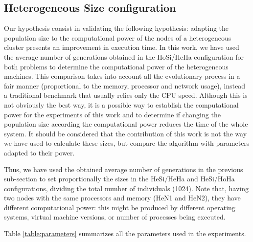 \documentclass[final,1p,times]{elsarticle}
\begin{document}
\subsection{Heterogeneous Size configuration}

Our hypothesis consist in validating the following hypothesis: adapting the population size to the computational power of the nodes of a heterogeneous cluster presents an improvement in execution time. In this work, we have used the average number of generations obtained in the HoSi/HeHa configuration for both problems to determine the computational power of the heterogeneous machines. This comparison takes into account all the evolutionary process in a fair manner (proportional to the memory, processor and network usage), instead a traditional benchmark that usually relies only the CPU speed. Although this is not obviously the best way, it is a possible way to establish the computational power for the experiments of this work and to determine if changing the population size according the computational power reduces the time of the whole system. It should be considered that the contribution of this work is not the way we have used to calculate these sizes, but compare the algorithm with parameters adapted to their power.

Thus, we have used the obtained average number of generations in the previous sub-section to set proportionally the sizes in the HeSi/HeHa and HeSi/HoHa configurations, dividing the total number of individuals (1024). Note that, having two nodes with the same processors and memory (HeN1 and HeN2), they have different computational power: this might be produced by different operating systems, virtual machine versions, or number of processes being executed.

Table \ref{table:parameters} summarizes all the parameters used in the experiments.
\end{document}
